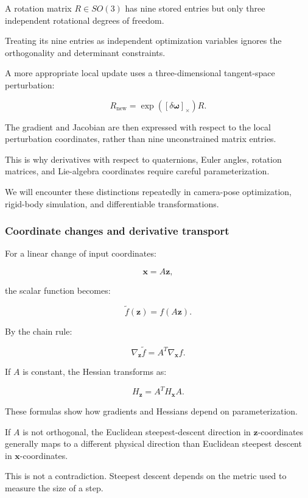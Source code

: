 A rotation matrix \(R\in SO(3)\) has nine stored entries but only three independent rotational degrees of freedom.

Treating its nine entries as independent optimization variables ignores the orthogonality and determinant constraints.

A more appropriate local update uses a three-dimensional tangent-space perturbation:

\[
R_{\text{new}}=\exp([\delta\boldsymbol\omega]_\times)R.
\]

The gradient and Jacobian are then expressed with respect to the local perturbation coordinates, rather than nine unconstrained matrix entries.

This is why derivatives with respect to quaternions, Euler angles, rotation matrices, and Lie-algebra coordinates require careful parameterization.

We will encounter these distinctions repeatedly in camera-pose optimization, rigid-body simulation, and differentiable transformations.

\subsubsection{Coordinate changes and derivative transport}\label{02-foundations-ii-ch021-coordinate-changes-and-derivative-transport}

\hypertarget{02-foundations-ii-ch021-coordinate-changes-and-derivative-transport}{}

For a linear change of input coordinates:

\[
\mathbf x=A\mathbf z,
\]

the scalar function becomes:

\[
\tilde f(\mathbf z)=f(A\mathbf z).
\]

By the chain rule:

\[
\boxed{ \nabla_{\mathbf z}\tilde f = A^T\nabla_{\mathbf x}f }.
\]

If \(A\) is constant, the Hessian transforms as:

\[
\boxed{ H_{\mathbf z}=A^TH_{\mathbf x}A }.
\]

These formulas show how gradients and Hessians depend on parameterization.

If \(A\) is not orthogonal, the Euclidean steepest-descent direction in \(\mathbf z\)-coordinates generally maps to a different physical direction than Euclidean steepest descent in \(\mathbf x\)-coordinates.

This is not a contradiction. Steepest descent depends on the metric used to measure the size of a step.

